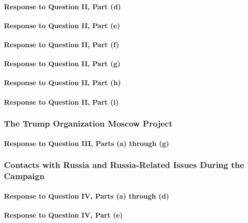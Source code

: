 \paragraph{Response to Question II, Part (d)}

\paragraph{Response to Question II, Part (e)}

\paragraph{Response to Question II, Part (f)}

\paragraph{Response to Question II, Part (g)}

\paragraph{Response to Question II, Part (h)}

\paragraph{Response to Question II, Part (i)}

\subsubsection{The Trump Organization Moscow Project}

\paragraph{Response to Question III, Parts (a) through (g)}

\subsubsection{Contacts with Russia and Russia-Related Issues During the Campaign}

\paragraph{Response to Question IV, Parts (a) through (d)}

\paragraph{Response to Question IV, Part (e)}

